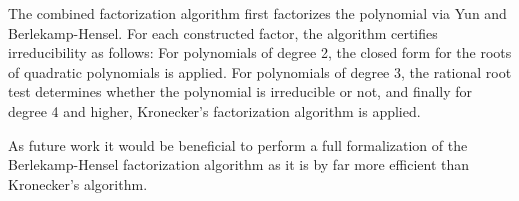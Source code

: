 \documentclass[11pt,a4paper]{article}
\begin{document}
The combined factorization algorithm first factorizes the polynomial
via Yun and Berlekamp-Hensel. For each constructed factor, the algorithm 
certifies irreducibility as follows: For polynomials of degree 2, the 
closed form for the roots of quadratic polynomials is applied. For polynomials of degree 3, 
the rational root test determines whether the polynomial is irreducible or not, and finally
for degree 4 and higher, Kronecker's factorization algorithm is applied.

As future work it would be beneficial to perform a full formalization of 
the Berlekamp-Hensel factorization algorithm as it is by far more efficient than Kronecker's algorithm.






\end{document}
